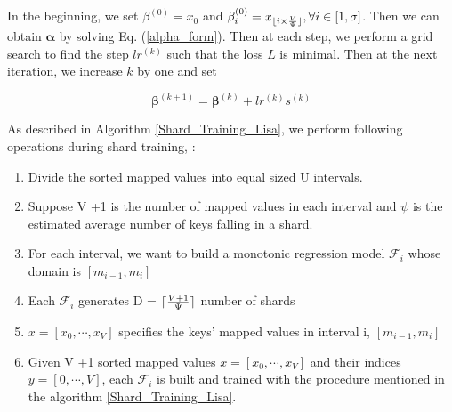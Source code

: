 
In the beginning, we set $\beta^{(0)}=x_0$ and $\beta_i^{(0)}=x_{\lfloor i\times \frac{V}{\Psi}\rfloor}, \forall i\in[1,\sigma]$. Then we can obtain $\boldsymbol{\alpha}$ by solving Eq. (\ref{alpha_form}). Then at each step, we perform a grid search to find the step $lr^{(k)}$ such that the loss $L$ is minimal. Then at the next iteration, we increase $k$ by one and set 

$$
\boldsymbol{\beta}^{(k+1)}=\boldsymbol{\beta}^{(k)} + lr^{(k)}s^{(k)}
$$


As described in Algorithm \ref{Shard_Training_Lisa}, we perform  following operations during shard training, :

\begin{enumerate}
	\item Divide the sorted mapped values into equal sized U intervals.
	\item Suppose V +1 is the number of mapped values in each interval and $\psi$ is the estimated average number of keys falling in a shard.
	\item For each interval, we want to build a monotonic regression
    model $ \mathcal {F}_{i}$ whose domain is $[m_{i-1},m_{i}]$ 
 
 	\item Each $\mathcal{F}_{i}$ generates D = $\lceil\frac{V+1}{\Psi}\rceil$ number of shards 
    
    \item $x =[x_0,\cdots, x_V] $ specifies the keys' mapped values in interval i, $[m_{i-1},m_{i}]$ 
    
    \item Given V +1 sorted mapped values $x =[x_0,\cdots, x_V]$ and their indices $y =[0,\cdots, V]$, each $\mathcal{F}_{i}$ is built and trained with the procedure mentioned in the algorithm \ref{Shard_Training_Lisa}.
    

\end{enumerate}

